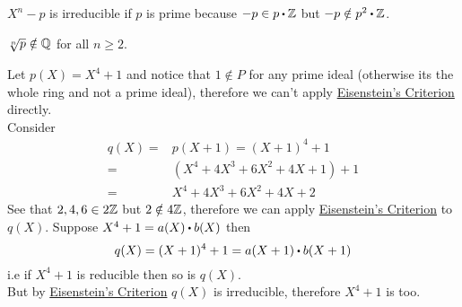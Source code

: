 \documentclass[../Main.tex]{subfiles}
\begin{document}
\begin{example}
	$X^n-p$ is irreducible if $p$ is prime because $-p\in p\rdot \Z$ but $-p \notin p^2\rdot \Z$.
\end{example}
\begin{crl}
	$\sqrt[n]{p}\notin \mathbb{Q}$ for all  $n\ge 2$.
\end{crl}
\begin{example}
	Let $p(X)=X^4+1$ and notice that $1\notin P$ for any prime ideal (otherwise its the whole ring and not a prime ideal), therefore we can't apply \hyperref[thm:eisen]{Eisenstein's Criterion} directly.\\
	Consider
	\begin{align*}
	q(X)=&p(X+1)=(X+1)^4+1\\
	=& (X^4+4X^3+6X^2+4X+1)+1\\
	=& X^4+4X^3+6X^2+4X+2
	\end{align*}
	See that $2,4,6\in 2\mathbb{Z}$ but $2\notin 4\mathbb{Z}$, therefore we can apply \hyperref[thm:eisen]{Eisenstein's Criterion} to $q(X)$.
	Suppose $X^4+1=a(X)\rdot b(X)$ then 
	\[q(X)=(X+1)^4+1=a(X+1)\rdot b(X+1)\]
	i.e if $X^4+1$ is reducible then so is $q(X)$.\\
	But by \hyperref[thm:eisen]{Eisenstein's Criterion} $q(X)$ is irreducible, therefore $X^4+1$ is too.
\end{example}
\end{document}
